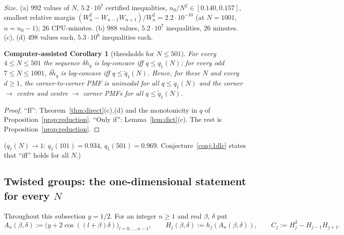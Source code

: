 \documentclass[11pt,a4paper]{article}
\newtheorem{cacorollary}[theorem]{Computer-assisted Corollary}
\theoremstyle{definition}
\begin{document}
\emph{Size.} (a) 992 values of $N$, $5.2\cdot10^7$ certified inequalities, $n_0/N^2\in[0.140,0.157]$, smallest relative margin $(W_n^2-W_{n-1}W_{n+1})/W_n^2=2.2\cdot10^{-10}$ (at $N=1001$, $n=n_0-1$); 26 CPU-minutes. (b) 988 values, $5.2\cdot10^7$ inequalities, 26 minutes. (c), (d) 498 values each, $5.3\cdot10^6$ inequalities each.

\begin{cacorollary}[thresholds for $N\le501$]\label{cor:thr1d}
For every $4\le N\le501$ the sequence $\delta h_q$ is log-concave \emph{iff} $q\le q_1(N)$; for every odd $7\le N\le1001$, $\delta\tilde h_q$ is log-concave iff $q\le\tilde q_1(N)$. Hence, for these $N$ and \emph{every} $d\ge1$, the corner-to-corner PMF is unimodal for all $q\le q_1(N)$ and the corner $\to$ centre and centre $\to$ corner PMFs for all $q\le\tilde q_1(N)$.
\end{cacorollary}
\begin{proof}
``If'': Theorem~\ref{thm:direct}(c),(d) and the monotonicity in $q$ of Proposition~\ref{prop:reduction}. ``Only if'': Lemma~\ref{lem:dict}(c). The rest is Proposition~\ref{prop:reduction}.
\end{proof}
($q_1(N)\to1$: $q_1(101)=0.934$, $q_1(501)=0.969$. Conjecture~\ref{conj:1dlc} states that ``iff'' holds for all $N$.)

\subsection{Twisted groups: the one-dimensional statement for every $N$}\label{sec:twisted}

Throughout this subsection $y=1/2$. For an integer $n\ge1$ and real $\beta$, $\delta$ put
\[
A_n(\beta,\delta):=\bigl(y+2\cos((l+\beta)\delta)\bigr)_{l=0,\dots,n-1},\qquad H_j(\beta,\delta):=h_j(A_n(\beta,\delta)),\qquad C_j:=H_j^2-H_{j-1}H_{j+1}.
\]
\end{document}

